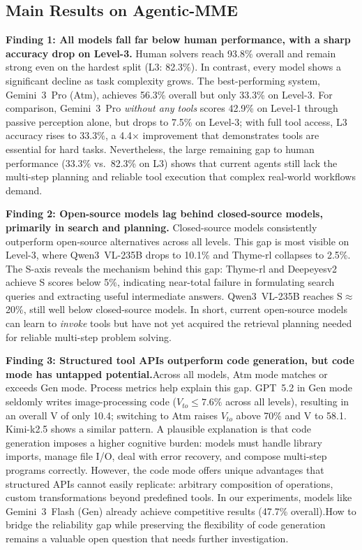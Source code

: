 \documentclass[runningheads]{llncs}
\theoremstyle{plain}
\theoremstyle{definition}
\theoremstyle{remark}
\begin{document}
\subsection{Main Results on Agentic-MME}
\label{sec:exp_main}
\noindent\textbf{Finding 1: All models fall far below human performance, with
a sharp accuracy drop on Level-3.} Human solvers reach 93.8\% overall and remain strong even on the hardest split (L3: 82.3\%). In contrast, every model shows a significant decline as task complexity grows. The best-performing system, Gemini~3~Pro (Atm), achieves 56.3\% overall but only 33.3\% on Level-3. For comparison, Gemini~3~Pro \emph{without any tools} scores 42.9\% on Level-1 through passive perception alone, but drops to 7.5\% on Level-3; with full tool access, L3 accuracy rises to 33.3\%, a 4.4$\times$ improvement that demonstrates tools are essential for hard tasks. Nevertheless, the large remaining gap to human performance (33.3\% vs.\ 82.3\% on L3) shows that current agents still lack the
multi-step planning and reliable tool execution that complex real-world workflows demand.

\vspace{1mm}
\noindent\textbf{Finding 2: Open-source models lag behind closed-source
models, primarily in search and planning.}
Closed-source models consistently outperform open-source alternatives
across all levels. This gap is most visible on Level-3, where Qwen3~VL-235B drops to
10.1\% and Thyme-rl collapses to 2.5\%. The S-axis reveals the mechanism behind this gap: Thyme-rl and Deepeyesv2 achieve S scores below 5\%, indicating near-total failure
in formulating search queries and extracting useful intermediate
answers. Qwen3~VL-235B reaches S$\approx$20\%, still well below closed-source
models. In short, current open-source models can learn to \emph{invoke} tools
but have not yet acquired the retrieval planning needed for reliable
multi-step problem solving.

\vspace{1mm}
\noindent\textbf{Finding 3: Structured tool APIs outperform code generation,
but code mode has untapped potential.}Across all models, Atm mode matches or exceeds Gen mode. Process metrics help explain this gap. GPT~5.2 in Gen mode seldomly writes image-processing code ($V_{\mathit{to}} \leq 7.6\%$ across all levels), resulting in an
overall V of only 10.4; switching to Atm raises $V_{\mathit{to}}$ above 70\% and V to 58.1.
Kimi-k2.5 shows a similar pattern. A plausible explanation is that code generation imposes a higher cognitive burden: models must handle library imports, manage file
I/O, deal with error recovery, and compose multi-step programs correctly. However, the code mode offers unique advantages that structured APIs cannot easily replicate: arbitrary composition of operations, custom transformations beyond predefined tools. In our experiments, models like Gemini~3~Flash (Gen) already achieve competitive results (47.7\% overall).How to bridge the reliability gap while preserving the flexibility
of code generation remains a valuable open question that needs further investigation.
\end{document}

